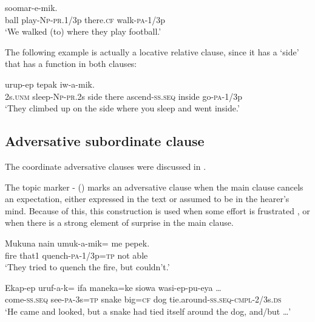 \ea%
\label{ex:8:x1626}
  soomar-e-mik.\\
ball  play-\textsc{Np}-\textsc{pr}.1/3p there.\textsc{cf} walk-\textsc{pa}-1/3p\\
\glt`We walked (to) where they play football.'
\z


The following example is actually a locative relative clause, since it has a   `side' that has a function in both clauses:

\ea%
\label{ex:8:x1638}
  urup-ep  tepak  iw-a-mik. \\
2s.\textsc{unm} sleep-\textsc{Np}-\textsc{pr}.2s side there ascend-\textsc{ss}.\textsc{seq} inside go-\textsc{pa}-1/3p\\
\glt`They climbed up on the side where you sleep and went inside.'
\z


\subsection{Adversative subordinate clause} \label{sec:8.3.4}

The coordinate adversative clauses were discussed in .

The topic marker - () marks an adversative clause when the main clause cancels an expectation, either expressed in the text or assumed to be in the hearer's mind. Because of this, this construction is used when some effort is frustrated , or when there is a strong element of surprise  in the main clause. 

\ea%
\label{ex:8:x729}
\gll Mukuna  nain  umuk-a-mik=  me  pepek.\\
fire  that1 quench-\textsc{pa}-1/3p=\textsc{tp} not able\\
\glt`They tried to quench the fire, but couldn't.'
\z


\ea%
\label{ex:8:x730}
\gll Ekap-ep  uruf-a-k=  ifa  maneka=ke  siowa wasi-ep-pu-eya {\dots} \\
come-\textsc{ss}.\textsc{seq} see-\textsc{pa}-3s=\textsc{tp} snake  big=\textsc{cf} dog tie.around-\textsc{ss}.\textsc{seq}-\textsc{cmpl}-2/3s.\textsc{ds}\\
\glt`He came and looked, but a snake had tied itself around the dog, and/but {\dots}'
\z


